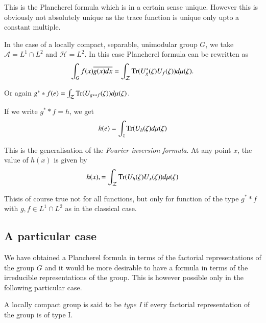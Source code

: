 This is the Plancherel formula which is in a certain sense unique.
However this is obviously not absolutely unique as the trace function
is unique only upto a constant multiple. 

In the case of a locally compact, separable, unimodular group $G$, we
take $\mathcal{A}= L^1 \cap L^{2}$ and $\mathscr{H} = L^{2}$. In this
case Plancherel formula can be rewritten as  
$$
 \int_{G} f(x) \overline{g (x)dx} = \int_{\mathcal{Z}} \operatorname{Tr} (U_{g}^*
 (\zeta) U_{f}(\zeta)) d \mu (\zeta). 
 $$

Or again $g^* * f(e) = \int_{\mathcal{Z}} \operatorname{Tr} (U_{g* * f} (\zeta) ) d
\mu (\zeta)$. 

If we write $g^{*}*f = h$, we get 
$$
h (e) = \int_{z} \operatorname{Tr} (U_{h} (\zeta)  d \mu (\zeta) 
$$

This is the generalisation of the \textit{Fourier inversion
  formula}. At any point $x$, the value of $h(x)$ is given by  
$$
h(x), = \int_{\mathcal{Z}} \operatorname{Tr} (U_{h} (\zeta) U_{x}(\zeta)) d \mu
 (\zeta) 
$$ 

This\pageoriginale is of course true not for all functions, but only
for function of 
the type $g^**f$ with $g,f \in L^1 \cap L^{2}$ as in the classical case.  


\subsection{A particular case}\label{partIII-chap3-sec3.6} %

We have obtained a Plancherel formula in terms of the factorial
representations of the group $G$ and it would be more desirable to have
a formula in terms of the irreducible representations of the
group. This is however possible only in the following particular
case. 

\begin{defi*}
A locally compact group is said to be  {\em type I} if every factorial
representation of the group is of type I. 
\end{defi*}
 
